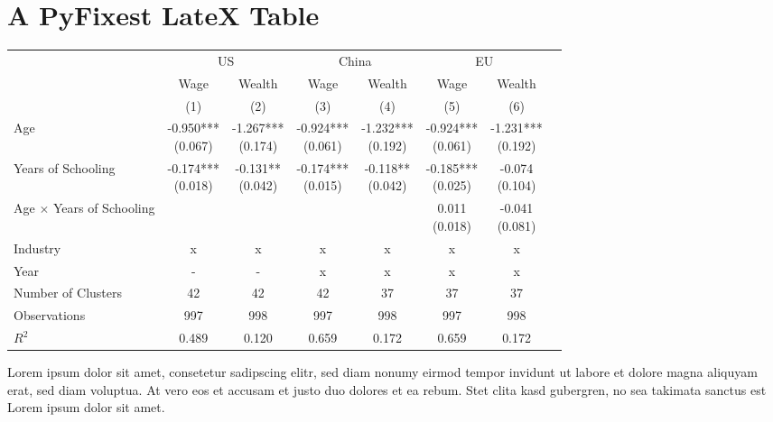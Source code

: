 \documentclass{article}%
\begin{document}
%
\normalsize%
\section{A PyFixest LateX Table}%
\label{sec:APyFixestLateXTable}%


\begin{table}[htbp]%
\renewcommand\cellalign{t}
\begin{threeparttable}
\begin{tabular}{lccccccc}
\toprule
 & \multicolumn{2}{c}{US} & \multicolumn{2}{c}{China} & \multicolumn{2}{c}{EU} \\
\cmidrule(lr){2-3} \cmidrule(lr){4-5} \cmidrule(lr){6-7}
 & Wage & Wealth & Wage & Wealth & Wage & Wealth \\
 & (1) & (2) & (3) & (4) & (5) & (6) \\
\midrule
\addlinespace
Age & \makecell{-0.950*** \\ (0.067)} & \makecell{-1.267*** \\ (0.174)} & \makecell{-0.924*** \\ (0.061)} & \makecell{-1.232*** \\ (0.192)} & \makecell{-0.924*** \\ (0.061)} & \makecell{-1.231*** \\ (0.192)} \\
Years of Schooling & \makecell{-0.174*** \\ (0.018)} & \makecell{-0.131** \\ (0.042)} & \makecell{-0.174*** \\ (0.015)} & \makecell{-0.118** \\ (0.042)} & \makecell{-0.185*** \\ (0.025)} & \makecell{-0.074 \\ (0.104)} \\
Age $\times$ Years of Schooling &  &  &  &  & \makecell{0.011 \\ (0.018)} & \makecell{-0.041 \\ (0.081)} \\
\midrule
\addlinespace
Industry & x & x & x & x & x & x \\
Year & - & - & x & x & x & x \\
\midrule
\addlinespace
Number of Clusters & 42 & 42 & 42 & 37 & 37 & 37 \\
Observations & 997 & 998 & 997 & 998 & 997 & 998 \\
$R^2$ & 0.489 & 0.120 & 0.659 & 0.172 & 0.659 & 0.172 \\
\bottomrule
\end{tabular}
\footnotesize Lorem ipsum dolor sit amet, consetetur sadipscing elitr, sed diam nonumy eirmod tempor invidunt ut labore et dolore magna aliquyam erat, sed diam voluptua. At vero eos et accusam et justo duo dolores et ea rebum. Stet clita kasd gubergren, no sea takimata sanctus est Lorem ipsum dolor sit amet.
\end{threeparttable}%
\end{table}

%
\end{document}
